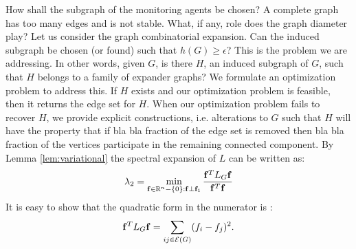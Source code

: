 \documentclass{amsart}
\theoremstyle{definition}
\theoremstyle{remark}
\numberwithin{equation}{section}
\def\bof{{\bf f}}
\def\R{\mathbb{R}}
\begin{document}
How shall the subgraph of the monitoring agents be chosen? A complete graph has too many edges and is not stable. What, if any, role does the graph diameter play? Let us consider the graph combinatorial expansion. Can the induced subgraph be chosen (or found) such that $h(G) \geq \epsilon$? This is the problem we are addressing. In other words, given $G$, is there $H$, an induced subgraph of $G$, such that $H$ belongs to a family of expander graphs? We formulate an optimization problem to address this. If $H$ exists and our optimization problem is feasible, then it returns the edge set for $H$. When our optimization problem fails to recover $H$, we provide explicit constructions, i.e. alterations to $G$ such that $H$ will have the property that if bla bla fraction of the edge set is removed then bla bla fraction of the vertices participate in the remaining connected component. 
By Lemma \ref{lem:variational} the spectral expansion of $L$ can be written as:
\begin{align*}
\lambda_2 = \min_{\bof \in \R^n - \{0\}:\bof \perp \bof_1} \frac{\bof^T L_G \bof}{\bof^T\bof}
\end{align*}
It is easy to show that the quadratic form in the numerator is \cite{Merris1994}: 
\begin{align}
\bof^T L_G \bof = \sum_{ij \in \mathcal{E}(G)} (f_i - f_j)^2.
\end{align}
\end{document}
